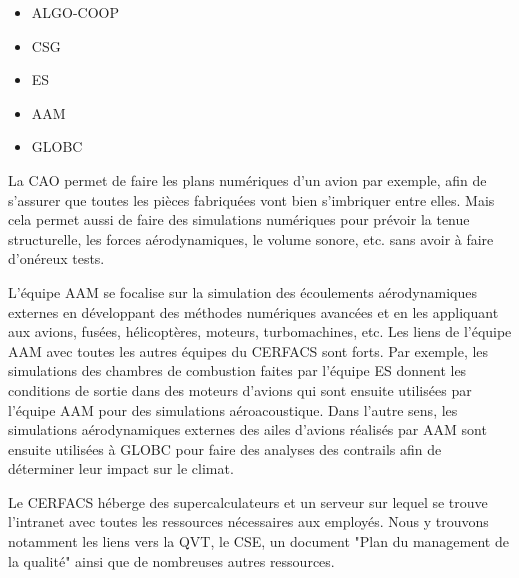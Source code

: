 
\begin{itemize}
    \item \ac{ALGO-COOP}
    \item \ac{CSG}
    \item \ac{ES}
    \item \ac{AAM}
    \item \ac{GLOBC}
\end{itemize}



La \ac{CAO} permet de faire les plans numériques d'un avion par exemple, afin de s'assurer que toutes les pièces fabriquées vont bien s'imbriquer entre elles. Mais cela permet aussi de faire des simulations numériques pour prévoir la tenue structurelle, les forces aérodynamiques, le volume sonore, etc. sans avoir à faire d'onéreux tests.

L'équipe AAM se focalise sur la simulation des écoulements aérodynamiques externes en développant des méthodes numériques avancées et en les appliquant aux avions, fusées, hélicoptères, moteurs, turbomachines, etc.
Les liens de l’équipe AAM avec toutes les autres équipes du CERFACS sont forts.
Par exemple, les simulations des chambres de combustion faites par l'équipe ES donnent les conditions de sortie dans des moteurs d'avions qui sont ensuite utilisées par l'équipe AAM pour des simulations aéroacoustique.
Dans l'autre sens, les simulations aérodynamiques externes des ailes d'avions réalisés par AAM sont ensuite utilisées à GLOBC pour faire des analyses des contrails afin de déterminer leur impact sur le climat.


Le CERFACS héberge des supercalculateurs et un serveur sur lequel se trouve l'intranet avec toutes les ressources nécessaires aux employés.  %
Nous y trouvons notamment les liens vers la \ac{QVT}, le \ac{CSE}, un document "Plan du management de la qualité" ainsi que de nombreuses autres ressources.


